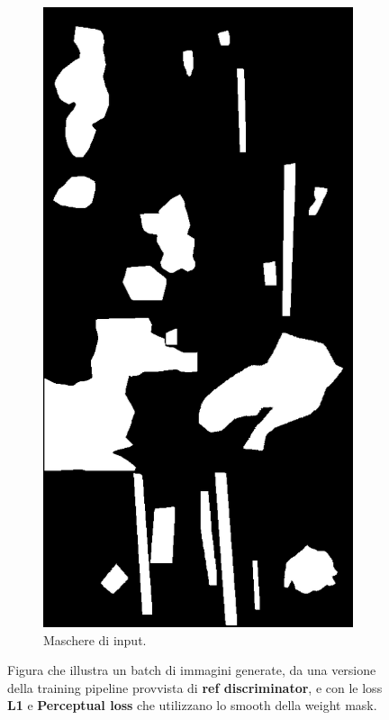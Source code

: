 \begin{figure}[htpb]
\begin{subfigure}[b]{0.3\textwidth}
        \label{fig:good_example_2}
    \end{subfigure}
    \hfill
    \begin{subfigure}[b]{0.3\textwidth}
        \includegraphics[width=\textwidth]{imgs/Coigan/results/buone/media_images_union_shapes_210000_00bedf5aec801c9d519d.png}
        \caption{Maschere di input.}
        \label{fig:good_example_3}
    \end{subfigure}
    \caption{Figura che illustra un batch di immagini generate, da una versione della training pipeline provvista di
    \textbf{ref discriminator}, e con le loss \textbf{L1} e \textbf{Perceptual loss} che utilizzano lo smooth della weight mask.}
    \label{fig:good_example}
\end{figure}

